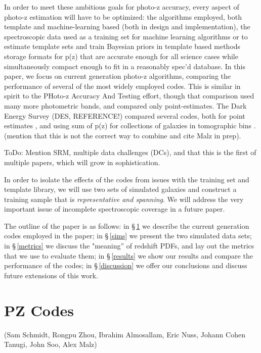 \documentclass[usenatbib]{mn2e}
\begin{document}
In order to meet these ambitious goals for photo-z accuracy, every aspect of photo-z estimation will have to be optimized: the algorithms employed, both template and machine-learning based (both in design and implementation),  the spectroscopic data used as a training set for machine learning algorithms or to estimate template sets and train Bayesian priors in template based methods
storage formats for p(z) that are accurate enough for all science cases while simultaneously compact enough to fit in a reasonably spec'd database.
In this paper, we focus on current generation photo-z algorithms, comparing the performance of several of the most widely employed codes.  This is similar in spirit to the PHoto-z Accuracy And Testing \citep[PHAT,][]{Hildebrandt:10} effort, though that comparison used many more photometric bands, and compared only point-estimates.  The Dark Energy Survey (DES, REFERENCE!) compared several codes, both for point estimates \citep[]{Sanchez:14}, and using sum of p(z) for collections of galaxies in tomographic bins \citep[]{Bonnett:16}.
(mention that this is not the correct way to combine and cite Malz in prep).  

ToDo: Mention SRM, multiple data challenges (DCs), and that this is the first of multiple papers, which will grow in sophistication.

In order to isolate the effects of the codes from issues with the training set and template library, we will use two sets of simulated galaxies and construct a training sample that is {\it representative and spanning}.  We will address the very important issue of incomplete spectroscopic coverage in a future paper.

The outline of the paper is as follows: in \S\,\ref{pzcodes} we describe the current generation codes employed in the paper; in \S\,\ref{sims} we present the two simulated data sets; in \S\,\ref{metrics} we discuss the "meaning'' of redshift PDFs, and lay out the metrics that we use to evaluate them; in \S\,\ref{results} we show our results and compare the performance of the codes; in \S\,\ref{discussion} we offer our conclusions and discuss future extensions of this work.

\section{PZ Codes}\label{pzcodes}

(Sam Schmidt, Rongpu Zhou, Ibrahim Almosallam, Eric Nuss, Johann Cohen Tanugi, John Soo, Alex Malz)
\end{document}
